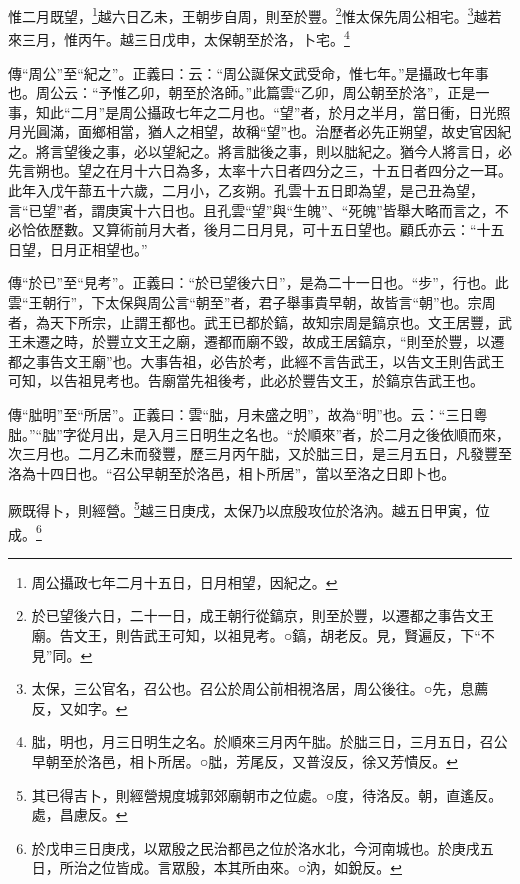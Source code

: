 惟二月既望，\footnote{周公攝政七年二月十五日，日月相望，因紀之。}越六日乙未，王朝步自周，則至於豐。\footnote{於已望後六日，二十一日，成王朝行從鎬京，則至於豐，以遷都之事告文王廟。告文王，則告武王可知，以祖見考。○鎬，胡老反。見，賢遍反，下“不見”同。}惟太保先周公相宅。\footnote{太保，三公官名，召公也。召公於周公前相視洛居，周公後往。○先，息薦反，又如字。}越若來三月，惟丙午。越三日戊申，太保朝至於洛，卜宅。\footnote{朏，明也，月三日明生之名。於順來三月丙午朏。於朏三日，三月五日，召公早朝至於洛邑，相卜所居。○朏，芳尾反，又普沒反，徐又芳憒反。}


{\noindent\zhuan{}\fzbyks 傳“周公”至“紀之”。正義曰：云：“周公誕保文武受命，惟七年。”是攝政七年事也。周公云：“予惟乙卯，朝至於洛師。”此篇雲“乙卯，周公朝至於洛”，正是一事，知此“二月”是周公攝政七年之二月也。“望”者，於月之半月，當日衝，日光照月光圓滿，面鄉相當，猶人之相望，故稱“望”也。治歷者必先正朔望，故史官因紀之。將言望後之事，必以望紀之。將言朏後之事，則以朏紀之。猶今人將言日，必先言朔也。望之在月十六日為多，太率十六日者四分之三，十五日者四分之一耳。此年入戊午蔀五十六歲，二月小，乙亥朔。孔雲十五日即為望，是己丑為望，言“已望”者，謂庚寅十六日也。且孔雲“望”與“生魄”、“死魄”皆舉大略而言之，不必恰依歷數。又算術前月大者，後月二日月見，可十五日望也。顧氏亦云：“十五日望，日月正相望也。” \par}

{\noindent\zhuan{}\fzbyks 傳“於已”至“見考”。正義曰：“於已望後六日”，是為二十一日也。“步”，行也。此雲“王朝行”，下太保與周公言“朝至”者，君子舉事貴早朝，故皆言“朝”也。宗周者，為天下所宗，止謂王都也。武王已都於鎬，故知宗周是鎬京也。文王居豐，武王未遷之時，於豐立文王之廟，遷都而廟不毀，故成王居鎬京，“則至於豐，以遷都之事告文王廟”也。大事告祖，必告於考，此經不言告武王，以告文王則告武王可知，以告祖見考也。告廟當先祖後考，此必於豐告文王，於鎬京告武王也。 \par}

{\noindent\zhuan{}\fzbyks 傳“朏明”至“所居”。正義曰：雲“朏，月未盛之明”，故為“明”也。云：“三日粵朏。”“朏”字從月出，是入月三日明生之名也。“於順來”者，於二月之後依順而來，次三月也。二月乙未而發豐，歷三月丙午朏，又於朏三日，是三月五日，凡發豐至洛為十四日也。“召公早朝至於洛邑，相卜所居”，當以至洛之日即卜也。 \par}

厥既得卜，則經營。\footnote{其已得吉卜，則經營規度城郭郊廟朝市之位處。○度，待洛反。朝，直遙反。處，昌慮反。}越三日庚戌，太保乃以庶殷攻位於洛汭。越五日甲寅，位成。\footnote{於戊申三日庚戌，以眾殷之民治都邑之位於洛水北，今河南城也。於庚戌五日，所治之位皆成。言眾殷，本其所由來。○汭，如銳反。}

